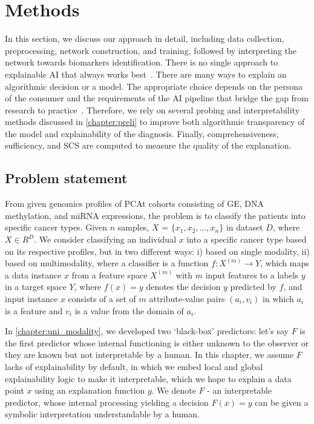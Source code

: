 \section{Methods}\label{chapter_5:mm}
In this section, we discuss our approach in detail, including data collection, preprocessing, network construction, and training, followed by interpreting the network towards biomarkers identification. There is no single approach to explainable AI that always works best~\cite{arya2019one}. There are many ways to explain an algorithmic decision or a model. The appropriate choice depends on the persona of the consumer and the requirements of the AI pipeline that bridge the gap from research to practice~\cite{arya2019one}. Therefore, we rely on several probing and interpretability methods discussed in \cref{chapter:preli} to improve both algorithmic transparency of the model and explainability of the diagnosis. Finally, comprehensiveness, sufficiency, and SCS are computed to measure the quality of the explanation. 

\iffalse
\subsection{Problem statement}
From given genomics profiles of PCAt cohorts consisting of GE, DNA methylation, and miRNA expressions, the problem is to classify the patients into specific cancer types. Given $n$ samples, $X$ = ${{\{x_1,x_2, ..., x_n}}\}$ in dataset $D$, where $X \in {R}^{D}$. We consider classifying an individual $x$ into a specific cancer type based on its respective profiles, but in two different ways: i) based on single modality, ii) based on multimodality, where a  classifier is a function $f: {X}^{(m)} \rightarrow {Y}$, which maps a data instance $x$ from a feature space ${X}^{(m)}$ with $m$ input features to a labels $y$ in a target space ${Y}$, where $f(x)=y$ denotes the decision $y$ predicted by $f$, and input instance $x$ consists of a set of $m$ attribute-value pairs $\left(a_{i}, v_{i}\right)$ in which $a_i$ is a feature and $v_i$ is a value from the domain of $a_i$. 

\hspace*{3.5mm} In \cref{chapter:uni_modality}, we developed two `black-box' predictors: let's say $F$ is the first predictor whose internal functioning is either unknown to the observer or they are known but not interpretable by a human. In this chapter, we assume $F$ lacks of explainability by default, in which we embed local and global explainability logic to make it interpretable, which we hope to explain a data point $x$ using an explanation function $g$. We denote ${F}$ - an interpretable predictor, whose internal processing yielding a decision ${F}(x)=y$ can be given a symbolic interpretation understandable by a human. 

